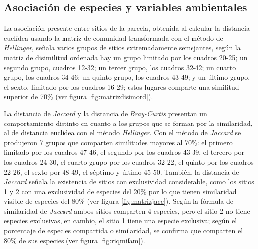 \documentclass[11pt,]{article}
\begin{document}
\subsection{Asociación de especies y variables
ambientales}\label{asociaciuxf3n-de-especies-y-variables-ambientales}

La asociación presente entre sitios de la parcela, obtenida al calcular
la distancia euclídea usando la matriz de comunidad transformada con el
método de \emph{Hellinger}, señala varios grupos de sitios
extremadamente semejantes, según la matriz de disimilitud ordenada hay
un grupo limitado por los cuadros 20-25; un segundo grupo, cuadros
12-32; un tercer grupo, los cuadros 32-42; un cuarto grupo, los cuadros
34-46; un quinto grupo, los cuadros 43-49; y un último grupo, el sexto,
limitado por los cuadros 16-29; estos lugares comparte una similitud
superior de 70\% (ver figura \ref{fig:matrizdisimord}).

La distancia de \emph{Jaccard} y la distancia de \emph{Bray-Curtis}
presentan un comportamiento distinto en cuanto a los grupos que se
forman por la similaridad, al de distancia euclídea con el método
\emph{Hellinger}. Con el método de \emph{Jaccard} se produjeron 7 grupos
que comparten similitudes mayores al 70\%: el primero limitado por los
cuadros 47-46, el segundo por los cuadros 43-39, el tercero por los
cuadros 24-30, el cuarto grupo por los cuadros 32-22, el quinto por los
cuadros 22-26, el sexto por 48-49, el séptimo y último 45-50. También,
la distancia de \emph{Jaccard} señala la existencia de sitios con
exclusividad considerable, como los sitios 1 y 2 con una exclusividad de
especies del 20\% por lo que tienen similaridad visible de especies del
80\% (ver figura \ref{fig:matrizjacc}). Según la fórmula de similaridad
de \emph{Jaccard} ambos sitios comparten 4 especies, pero el sitio 2 no
tiene especies exclusivas, en cambio, el sitio 1 tiene una especie
exclusiva; según el porcentaje de especies compartida o similaridad, se
confirma que comparten el 80\% de sus especies (ver figura
\ref{fig:riqmifam}).
\end{document}
